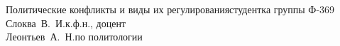 


\usepackage{color}
\usepackage[colorlinks,linkcolor=black,filecolor=blue,citecolor=darkgreen]{hyperref}


    {Политические конфликты и виды их регулирования}{студентка группы
    Ф-369\\Слоква~В.~И.}{к.ф.н., доцент\\Леонтьев~А.~Н.}{по политологии}
        
    \tableofcontents
    \thispagestyle{empty}
    \newpage
    
